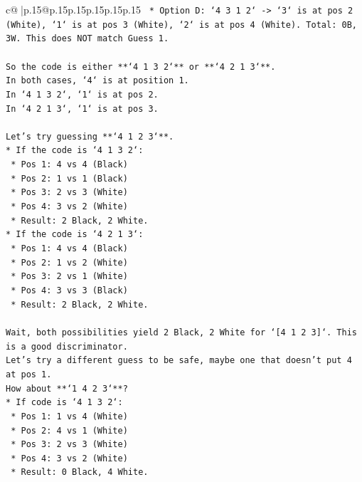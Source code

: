 \documentclass{article}
\begin{document}
{\begin{supertabular}{c@{$\;$}|p{.15\linewidth}@{}p{.15\linewidth}p{.15\linewidth}p{.15\linewidth}p{.15\linewidth}p{.15\linewidth}}
{{{\texttt{    *   Option D: `4 3 1 2` {-}> `3` is at pos 2 (White), `1` is at pos 3 (White), `2` is at pos 4 (White). Total: 0B, 3W. This does NOT match Guess 1.} \\
\\ 
\texttt{So the code is either **`4 1 3 2`** or **`4 2 1 3`**.} \\
\texttt{In both cases, `4` is at position 1.} \\
\texttt{In `4 1 3 2`, `1` is at pos 2.} \\
\texttt{In `4 2 1 3`, `1` is at pos 3.} \\
\\ 
\texttt{Let's try guessing **`4 1 2 3`**.} \\
\texttt{*   If the code is `4 1 3 2`:} \\
\texttt{    *   Pos 1: 4 vs 4 (Black)} \\
\texttt{    *   Pos 2: 1 vs 1 (Black)} \\
\texttt{    *   Pos 3: 2 vs 3 (White)} \\
\texttt{    *   Pos 4: 3 vs 2 (White)} \\
\texttt{    *   Result: 2 Black, 2 White.} \\
\texttt{*   If the code is `4 2 1 3`:} \\
\texttt{    *   Pos 1: 4 vs 4 (Black)} \\
\texttt{    *   Pos 2: 1 vs 2 (White)} \\
\texttt{    *   Pos 3: 2 vs 1 (White)} \\
\texttt{    *   Pos 4: 3 vs 3 (Black)} \\
\texttt{    *   Result: 2 Black, 2 White.} \\
\\ 
\texttt{Wait, both possibilities yield 2 Black, 2 White for `{[}4 1 2 3{]}`. This is a good discriminator.} \\
\texttt{Let's try a different guess to be safe, maybe one that doesn't put 4 at pos 1.} \\
\texttt{How about **`1 4 2 3`**?} \\
\texttt{*   If code is `4 1 3 2`:} \\
\texttt{    *   Pos 1: 1 vs 4 (White)} \\
\texttt{    *   Pos 2: 4 vs 1 (White)} \\
\texttt{    *   Pos 3: 2 vs 3 (White)} \\
\texttt{    *   Pos 4: 3 vs 2 (White)} \\
\texttt{    *   Result: 0 Black, 4 White.} \\
}}}
\end{supertabular}}
\end{document}
